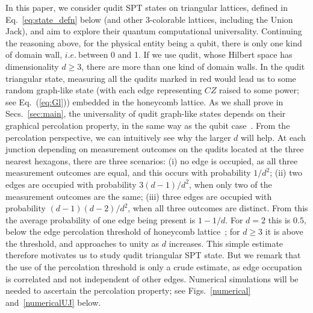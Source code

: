 \documentclass[aps,amsfonts,pra,twocolumn,showpacs]{revtex4-1}
\newcommand{\thatis}{$i.e.~$}
\begin{document}
In this paper, we consider qudit SPT states on triangular lattices, defined in Eq.~\ref{eq:state_defn} below (and other 3-colorable lattices, including the Union Jack), and aim to explore their quantum computational universality. 
Continuing the reasoning above, for the physical entity being a qubit, there is only one kind of domain wall, \thatis between 0 and 1. If we use qudit, whose Hilbert space has dimensionality $d \geq 3$, there are more than one kind of domain walls. In the qudit triangular state, measuring all the qudits marked in red would lead us to some random graph-like state (with each edge representing $CZ$ raised to some power; see Eq.~(\ref{eq:Gl})) embedded in the honeycomb lattice. As we shall prove in Secs.~\ref{sec:main}, the universality of qudit graph-like states depends on their graphical percolation property, in the same way as the qubit case~\cite{Browne2008,Wei2012}. From the percolation perspective, we can intuitively see why the larger $d$ will help. At each junction depending on measurement outcomes on the qudits located at the three nearest hexagons,  there are three scenarios: (i) no edge is occupied, as all three measurement outcomes are equal, and this occurs with probability ${1}/{d^2}$; (ii) two edges  are occupied with probability ${3(d-1)}/{d^2}$, when only two of the measurement outcomes are the same; (iii) three edges are occupied with probability ${(d-1)(d-2)}/{d^2}$, when all three outcomes are distinct. From this the average probability of one edge being present is $1-{1}/{d}$. For $d=2$ this is $0.5$, below the edge percolation threshold of honeycomb lattice~\cite{Sykes1964}; for $d \geq 3$ it is above the threshold, and approaches to unity as $d$ increases. This simple estimate therefore motivates us to study qudit triangular SPT state. But we remark that the use of the percolation threshold is only a crude estimate, as edge occupation is correlated and not independent of other edges. Numerical simulations will be needed to ascertain the percolation property; see Figs.~\ref{numerical} and~\ref{numericalUJ} below.
\end{document}
